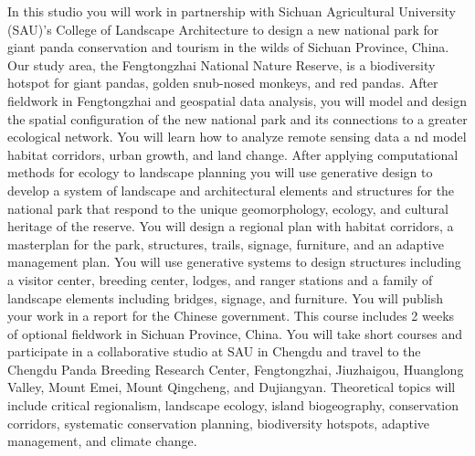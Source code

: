 \documentclass[11pt,article,oneside]{memoir}
\begin{document}
In this studio you will work in partnership 
with Sichuan Agricultural University (SAU)’s 
College of Landscape Architecture 
to design a new national park for giant panda 
conservation and tourism in the wilds of Sichuan Province, China. 
Our study area, the Fengtongzhai National Nature Reserve, 
is a biodiversity hotspot for 
giant pandas, golden snub-nosed monkeys, and red pandas. 
After fieldwork in Fengtongzhai and geospatial data analysis, 
you will model and design 
the spatial configuration of the new national park 
and its connections to a greater ecological network. 
You will learn how to analyze remote sensing data a
nd model habitat corridors, urban growth, and land change. 
After applying computational methods 
for ecology to landscape planning 
you will use generative design 
to develop a system of landscape 
and architectural elements and structures 
for the national park that respond to 
the unique geomorphology, ecology, and cultural heritage of the reserve. 
You will design a regional plan with 
habitat corridors, a masterplan for the park, 
structures, trails, signage, furniture, 
and an adaptive management plan. 
You will use generative systems to design structures including 
a visitor center, breeding center, lodges, and ranger stations 
and a family of landscape elements 
including bridges, signage, and furniture. 
You will publish your work in a report for the Chinese government. 
This course includes 2 weeks of optional fieldwork in Sichuan Province, China. 
You will take short courses and 
participate in a collaborative studio at SAU in Chengdu 
and travel to the Chengdu Panda Breeding Research Center, 
Fengtongzhai, Jiuzhaigou, Huanglong Valley, Mount Emei, 
Mount Qingcheng, and Dujiangyan. 
Theoretical topics will include critical regionalism,  
landscape ecology,  island biogeography, conservation corridors, 
systematic conservation planning, biodiversity hotspots, 
adaptive management, and climate change. 

\end{document}
